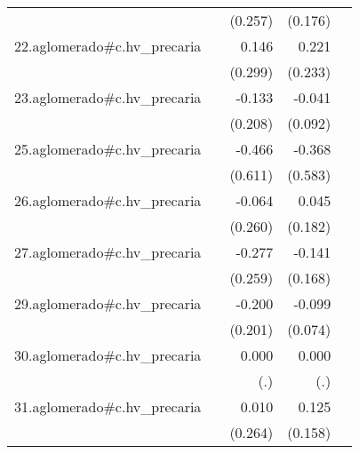 {\begin{longtable}{l*{4}{D{.}{.}{-1}}}
            &                     &     (0.257)         &     (0.176)         &                     \\
\addlinespace
22.aglomerado#c.hv\_precaria&                     &       0.146         &       0.221         &                     \\
            &                     &     (0.299)         &     (0.233)         &                     \\
\addlinespace
23.aglomerado#c.hv\_precaria&                     &      -0.133         &      -0.041         &                     \\
            &                     &     (0.208)         &     (0.092)         &                     \\
\addlinespace
25.aglomerado#c.hv\_precaria&                     &      -0.466         &      -0.368         &                     \\
            &                     &     (0.611)         &     (0.583)         &                     \\
\addlinespace
26.aglomerado#c.hv\_precaria&                     &      -0.064         &       0.045         &                     \\
            &                     &     (0.260)         &     (0.182)         &                     \\
\addlinespace
27.aglomerado#c.hv\_precaria&                     &      -0.277         &      -0.141         &                     \\
            &                     &     (0.259)         &     (0.168)         &                     \\
\addlinespace
29.aglomerado#c.hv\_precaria&                     &      -0.200         &      -0.099         &                     \\
            &                     &     (0.201)         &     (0.074)         &                     \\
\addlinespace
30.aglomerado#c.hv\_precaria&                     &       0.000         &       0.000         &                     \\
            &                     &         (.)         &         (.)         &                     \\
\addlinespace
31.aglomerado#c.hv\_precaria&                     &       0.010         &       0.125         &                     \\
            &                     &     (0.264)         &     (0.158)         &                     \\

\end{longtable}}
